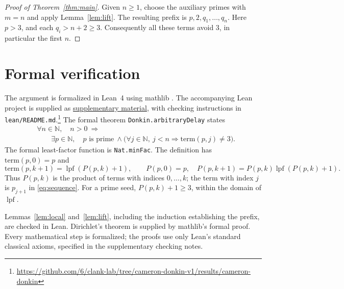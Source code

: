 \documentclass[11pt]{article}
\newcommand{\lpf}{\operatorname{lpf}}
\begin{document}
\begin{proof}[Proof of Theorem~\ref{thm:main}]
Given $n\geq1$, choose the auxiliary primes with $m=n$ and apply
Lemma~\ref{lem:lift}. The resulting prefix is $p,2,q_1,\ldots,q_n$.
Here $p>3$, and each $q_i>n+2\geq3$.
Consequently all these terms avoid $3$, in particular the first $n$.
\end{proof}

\section{Formal verification}

The argument is formalized in Lean~4 \cite{lean} using mathlib
\cite{mathlib}. The accompanying Lean project is supplied as
\href{https://github.com/6/clank-lab/tree/cameron-donkin-v1/results/cameron-donkin}{supplementary material},
with checking instructions in \texttt{lean/README.md}.\footnote{\url{https://github.com/6/clank-lab/tree/cameron-donkin-v1/results/cameron-donkin}}
The formal theorem \texttt{Donkin.arbitraryDelay} states
\[
 \begin{aligned}
 &\forall n\in\mathbb N,\quad n>0\ \Longrightarrow\\
 &\qquad \exists p\in\mathbb N,\quad p\text{ is prime}\ \land
 \bigl(\forall j\in\mathbb N,\ j<n\Longrightarrow\mathrm{term}(p,j)\ne3\bigr).
 \end{aligned}
\]
The formal least-factor function is \texttt{Nat.minFac}.
The definition has $\mathrm{term}(p,0)=p$ and
\[
 \mathrm{term}(p,k+1)=\lpf(P(p,k)+1),\qquad
 P(p,0)=p,\quad
 P(p,k+1)=P(p,k)\lpf(P(p,k)+1).
\]
Thus $P(p,k)$ is the product of terms with indices $0,\ldots,k$;
the term with index $j$ is $p_{j+1}$ in \eqref{eq:sequence}.
For a prime seed, $P(p,k)+1\geq3$, within the domain of $\lpf$.

Lemmas~\ref{lem:local} and~\ref{lem:lift}, including the induction
establishing the prefix, are checked in Lean. Dirichlet's theorem is
supplied by mathlib's formal proof. Every mathematical step is formalized;
the proofs use only Lean's standard classical axioms, specified in the
supplementary checking notes.
\end{document}
